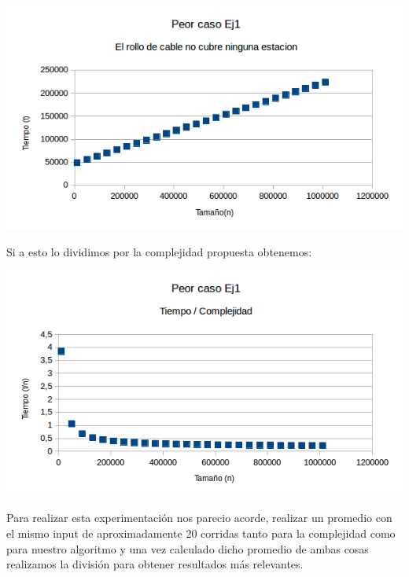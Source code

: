 \vspace*{0.3cm} \vspace*{0.3cm}
  \begin{center}
 \includegraphics[scale=0.8]{./EJ1/peorcasoej1.png}
  \end{center}
  \vspace*{0.3cm}

Si a esto lo dividimos por la complejidad propuesta obtenemos:\\

\vspace*{0.3cm} \vspace*{0.3cm}
  \begin{center}
 \includegraphics[scale=0.8]{./EJ1/peorcasoej11.png}
  \end{center}
  \vspace*{0.3cm}
  
  Para realizar esta experimentaci\'on nos parecio acorde, realizar un promedio con el mismo input de aproximadamente 20 corridas
tanto para la complejidad como para nuestro algoritmo y una vez calculado dicho promedio de ambas cosas realizamos la divisi\'on para
obtener resultados m\'as relevantes.\\ 


